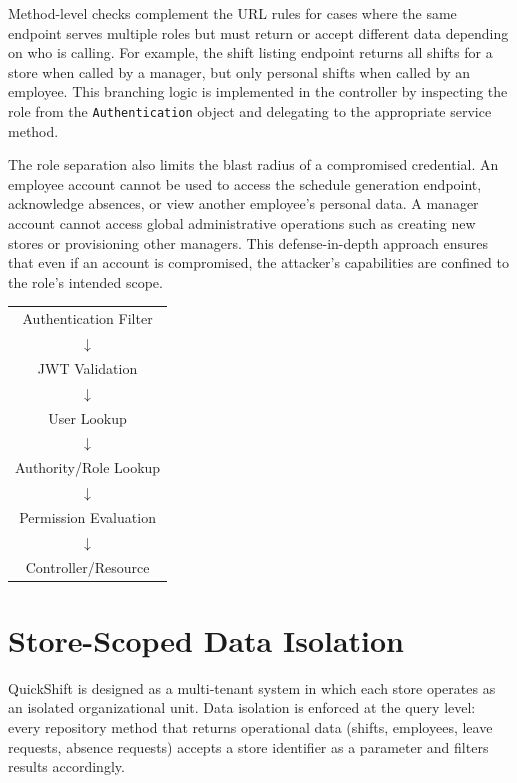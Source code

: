 \par Method-level checks complement the URL rules for cases where the same endpoint serves multiple roles but must return or accept different data depending on who is calling. For example, the shift listing endpoint returns all shifts for a store when called by a manager, but only personal shifts when called by an employee. This branching logic is implemented in the controller by inspecting the role from the \texttt{Authentication} object and delegating to the appropriate service method.

\par The role separation also limits the blast radius of a compromised credential. An employee account cannot be used to access the schedule generation endpoint, acknowledge absences, or view another employee's personal data. A manager account cannot access global administrative operations such as creating new stores or provisioning other managers. This defense-in-depth approach ensures that even if an account is compromised, the attacker's capabilities are confined to the role's intended scope. \cite{RBAC2}

\begin{center}
\begin{tabular}{c}
Authentication Filter \\
$\downarrow$ \\
JWT Validation \\
$\downarrow$ \\
User Lookup \\
$\downarrow$ \\
Authority/Role Lookup \\
$\downarrow$ \\
Permission Evaluation \\
$\downarrow$ \\
Controller/Resource \\
\end{tabular}
\end{center}

\section{Store-Scoped Data Isolation}
\par QuickShift is designed as a multi-tenant system in which each store operates as an isolated organizational unit. Data isolation is enforced at the query level: every repository method that returns operational data (shifts, employees, leave requests, absence requests) accepts a store identifier as a parameter and filters results accordingly.


